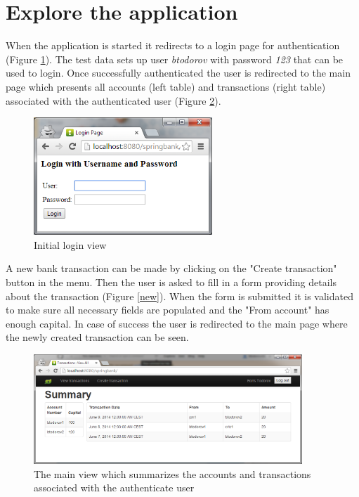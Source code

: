 \documentclass[a4paper, notitlepage]{article}
\begin{document}
\section{Explore the application}

When the application is started it redirects to a login page for authentication (Figure \ref{login}). The test data sets up user \textit{btodorov} with password \textit{123} that can be used to login. Once successfully authenticated the user is redirected to the main page which presents all accounts (left table) and transactions (right table) associated with the authenticated user (Figure \ref{main}). 

\bigskip
\begin{figure}[H]
  \centering
    \includegraphics[width=0.6\textwidth]{login_Screen.png}
    \caption{Initial login view}
    \label{login}
\end{figure}
\bigskip

A new bank transaction can be made by clicking on the "Create transaction" button in the menu. Then the user is asked to fill in a form providing details about the transaction (Figure \ref{new}). When the form is submitted it is validated to make sure all necessary fields are populated and the "From account" has enough capital. In case of success the user is redirected to the main page where the newly created transaction can be seen.
 
\bigskip
\begin{figure}[H]
  \centering
    \includegraphics[width=0.9\textwidth]{main_Screen.png}
    \caption{The main view which summarizes the accounts and transactions associated with the authenticate user}
    \label{main}
\end{figure}
\bigskip
\end{document}
